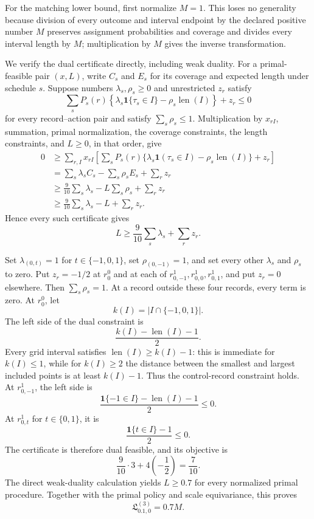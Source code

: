 For the matching lower bound, first normalize \(M=1\).  This loses no generality because division of every outcome and interval endpoint by the declared positive number \(M\) preserves assignment probabilities and coverage and divides every interval length by \(M\); multiplication by \(M\) gives the inverse transformation.

We verify the dual certificate directly, including weak duality.  For a primal-feasible pair \((x,L)\), write \(C_s\) and \(E_s\) for its coverage and expected length under schedule \(s\).  Suppose numbers \(\lambda_s,\rho_s\ge0\) and unrestricted \(z_r\) satisfy
\[
\sum_sP_s(r)\left\{\lambda_s\mathbf 1\{\tau_s\in I\}-\rho_s\operatorname{len}(I)\right\}+z_r\le0
\]
for every record--action pair and satisfy \(\sum_s\rho_s\le1\).  Multiplication by \(x_{rI}\), summation, primal normalization, the coverage constraints, the length constraints, and \(L\ge0\), in that order, give
\[
\begin{aligned}
0
&\ge \sum_{r,I}x_{rI}\left[\sum_sP_s(r)\{\lambda_s\mathbf 1(\tau_s\in I)-\rho_s\operatorname{len}(I)\}+z_r\right]\\
&=\sum_s\lambda_s C_s-\sum_s\rho_sE_s+\sum_rz_r\\
&\ge \frac9{10}\sum_s\lambda_s-L\sum_s\rho_s+\sum_rz_r\\
&\ge \frac9{10}\sum_s\lambda_s-L+\sum_rz_r.
\end{aligned}
\]
Hence every such certificate gives
\[
L\ge\frac9{10}\sum_s\lambda_s+\sum_rz_r.
\]

Set \(\lambda_{(0,t)}=1\) for \(t\in\{-1,0,1\}\), set \(\rho_{(0,-1)}=1\), and set every other \(\lambda_s\) and \(\rho_s\) to zero.  Put \(z_r=-1/2\) at \(r_0^0\) and at each of \(r_{0,-1}^1,r_{0,0}^1,r_{0,1}^1\), and put \(z_r=0\) elsewhere.  Then \(\sum_s\rho_s=1\).  At a record outside these four records, every term is zero.  At \(r_0^0\), let
\[
k(I)=|I\cap\{-1,0,1\}|.
\]
The left side of the dual constraint is
\[
\frac{k(I)-\operatorname{len}(I)-1}{2}.
\]
Every grid interval satisfies \(\operatorname{len}(I)\ge k(I)-1\): this is immediate for \(k(I)\le1\), while for \(k(I)\ge2\) the distance between the smallest and largest included points is at least \(k(I)-1\).  Thus the control-record constraint holds.  At \(r_{0,-1}^1\), the left side is
\[
\frac{\mathbf 1\{-1\in I\}-\operatorname{len}(I)-1}{2}\le0.
\]
At \(r_{0,t}^1\) for \(t\in\{0,1\}\), it is
\[
\frac{\mathbf 1\{t\in I\}-1}{2}\le0.
\]
The certificate is therefore dual feasible, and its objective is
\[
\frac9{10}\cdot3+4\left(-\frac12\right)=\frac7{10}.
\]
The direct weak-duality calculation yields \(L\ge0.7\) for every normalized primal procedure.  Together with the primal policy and scale equivariance, this proves
\[
\mathfrak L^{(3)}_{0.1,0}=0.7M.
\]

